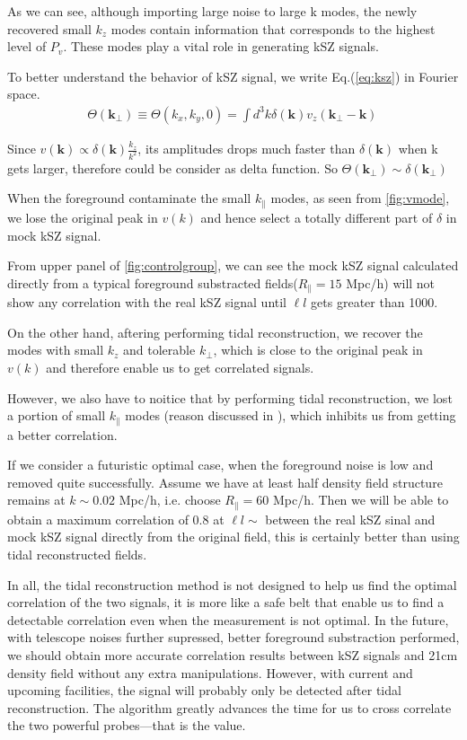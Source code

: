 As we can see, although importing large noise to large k modes, 
the newly recovered small $k_z$ modes contain information that
corresponds to the highest level of $P_{v}$. 
These modes play a vital role in generating kSZ signals.

To better understand the behavior of kSZ signal, we write Eq.(\ref{eq:ksz}) in Fourier space.\begin{eqnarray}
\Theta(\bm{k_\perp})\equiv \Theta(k_x,k_y,0)=\int d^3k \delta(\bm{k}) v_z(\bm{k_\perp}-\bm{k})\,
\end{eqnarray}

Since $v(\bm{k})\propto \delta(\bm{k})\frac{k_z}{k^2}$, 
its amplitudes drops much faster than $\delta(\bm{k})$ when k gets larger, 
therefore could be consider as delta function. So $\Theta(\bm{k_\perp})\sim\delta(\bm{k_\perp})$

When the foreground contaminate the small $k_\parallel$ modes, as seen
from \ref{fig:vmode}, we lose the original peak in $v(k)$ and hence
select a totally different part of $\delta$ in mock kSZ signal.

From upper panel of \ref{fig:controlgroup}, we can see the mock kSZ
signal calculated directly from a typical foreground substracted
fields($R_\parallel=15$ Mpc/h) will not
show any correlation with the real kSZ signal until $\ell{l}$ gets greater
than 1000.

On the other hand, aftering performing tidal reconstruction, we
recover the modes with small $k_z$ and tolerable $k_\perp$, 
which is close to the original peak in $v(k)$ and therefore enable us to get correlated signals.


However, we also have to noitice that by performing tidal reconstruction, 
we lost a portion of small $k_\parallel$ modes (reason discussed in \cite{2015:zhu}), 
which inhibits us from getting a better correlation.

If we consider a futuristic optimal case, when the foreground noise is
low and removed quite successfully.
Assume we have at least half density field structure remains at $k\sim
0.02$ Mpc/h, i.e. choose $R_\parallel=60$ Mpc/h.
Then we will be able to obtain a maximum correlation of 0.8 at
$\ell{l}\sim $ between the real kSZ sinal and mock kSZ signal directly
from the original field, this is certainly better than using tidal
reconstructed fields.

In all, the tidal reconstruction method is not designed to help us find the optimal correlation of the two signals, 
it is more like a safe belt that enable us to find a detectable correlation even when the measurement is not optimal. 
In the future, with telescope noises further supressed, 
better foreground substraction performed,
we should obtain more accurate correlation results between kSZ
signals and 21cm density field without any extra manipulations.
However, with current and upcoming facilities, the signal will
probably only be detected after tidal reconstruction.
The algorithm greatly advances the time for us to cross correlate
the two powerful probes---that is the value.


